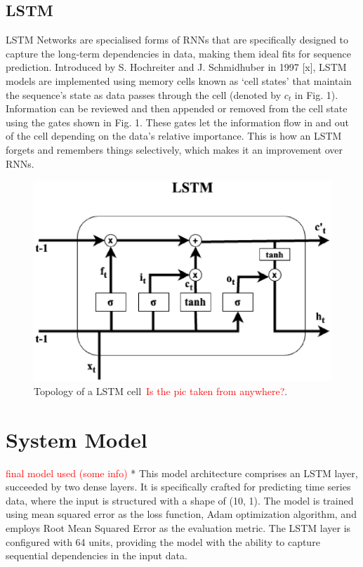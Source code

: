 \documentclass[conference]{IEEEtran}
\begin{document}
\subsection{LSTM}
LSTM Networks are specialised forms of RNNs that are specifically designed to capture the long-term dependencies in data, making them ideal fits for sequence prediction. Introduced by S. Hochreiter and J. Schmidhuber in 1997 [x], LSTM models are implemented using memory cells known as ‘cell states’ that maintain the sequence's state as data passes through the cell (denoted by $c_{t}$ in Fig. 1). Information can be reviewed and then appended or removed from the cell state using the gates shown in Fig. 1. These gates let the information flow in and out of the cell depending on the data's relative importance. This is how an LSTM forgets and remembers things selectively, which makes it an improvement over RNNs.

\begin{figure}[ht]
  \centering
  \includegraphics[width=0.8\linewidth]{LSTM.eps}
  \caption{Topology of a LSTM cell~\textcolor{red}{Is the pic taken from anywhere?}.}
  \label{fig:lstm}
\end{figure}

\section{System Model}

\textcolor{red}{final model used (some info)}
*
This model architecture comprises an LSTM layer, succeeded by two dense layers. It is specifically crafted for predicting time series data, where the input is structured with a shape of (10, 1). The model is trained using mean squared error as the loss function, Adam optimization algorithm, and employs Root Mean Squared Error as the evaluation metric. The LSTM layer is configured with 64 units, providing the model with the ability to capture sequential dependencies in the input data.
\end{document}
